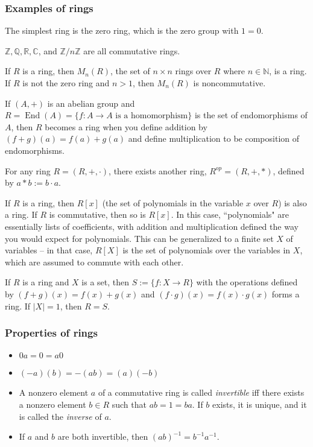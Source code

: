 \documentclass[12pt]{article}
\begin{document}
\subsubsection{Examples of rings}
The simplest ring is the zero ring, which is the zero group with $1=0$.
\par
$ \mathbb{Z}, \mathbb{Q}, \mathbb{R}, \mathbb{C}$, and $ \mathbb{Z}/n \mathbb{Z}$ are all commutative rings.
\par
If $R$ is a ring, then $M_n(R)$, the set of $n \times n$ rings over $R$ where $n \in \mathbb{N}$, is a ring. If $R$ is not the zero ring and $n>1$, then $M_n(R)$ is noncommutative.
\par
If $(A,+)$ is an abelian group and $R=\operatorname{End}(A)=\{f:A \rightarrow A \text{ is a homomorphism}\}$ is the set of endomorphisms of $A$, then $R$ becomes a ring when you define addition by $(f+g)(a)=f(a)+g(a)$ and define multiplication to be composition of endomorphisms.
\par
For any ring $R = (R,+,\cdot)$, there exists another ring, $R^{op}=(R,+,*)$, defined by $a*b:=b \cdot a$.
\par
If $R$ is a ring, then $R[x]$ (the set of polynomials in the variable $x$ over $R$) is also a ring. If $R$ is commutative, then so is $R[x]$. In this case, ``polynomials" are essentially lists of coefficients, with addition and multiplication defined the way you would expect for polynomials. This can be generalized to a finite set $X$ of variables -- in that case, $R[X]$ is the set of polynomials over the variables in $X$, which are assumed to commute with each other.
\par
If $R$ is a ring and $X$ is a set, then $S:=\{f:X \rightarrow R\}$ with the operations defined by $(f+g)(x)=f(x)+g(x)$ and $(f \cdot g)(x) = f(x) \cdot g(x)$ forms a ring. If $|X|=1$, then $R=S$.

\subsubsection{Properties of rings}
\begin{itemize}
    \item $0a=0=a0$
    \item $(-a)(b)=-(ab)=(a)(-b)$
    \item A nonzero element $a$ of a commutative ring is called \textit{invertible} iff there exists a nonzero element $b \in R$ such that $ab=1=ba$. If $b$ exists, it is unique, and it is called the \textit{inverse} of $a$.
    \item If $a$ and $b$ are both invertible, then $(ab)^{-1} = b^{-1}a^{-1}$.
\end{itemize}
\end{document}
